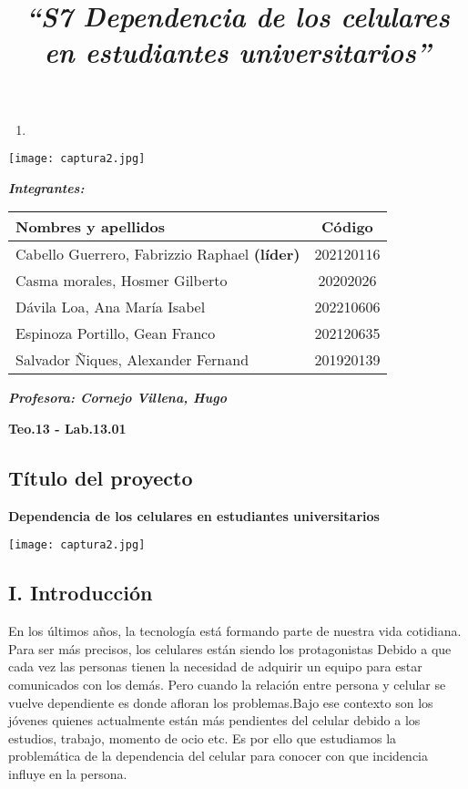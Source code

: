 \documentclass[
]{article}
\title{\textbf{\emph{``S7 Dependencia de los celulares en estudiantes
universitarios''}}}
\author{}
\date{\vspace{-2.5em}}
\begin{document}
\maketitle

\begin{enumerate}
\def\labelenumi{\arabic{enumi}.}
\item
\end{enumerate}

\texttt{[image: captura2.jpg]}

\textbf{\emph{Integrantes:}}

\begin{longtable}[]{@{}lc@{}}
\toprule()
\textbf{Nombres y apellidos} & \textbf{Código} \\
\midrule()
\endhead
Cabello Guerrero, Fabrizzio Raphael \textbf{(líder)} & 202120116 \\
Casma morales, Hosmer Gilberto & 20202026 \\
Dávila Loa, Ana María Isabel & 202210606 \\
Espinoza Portillo, Gean Franco & 202120635 \\
Salvador Ñiques, Alexander Fernand & 201920139 \\
\bottomrule()
\end{longtable}

\textbf{\emph{Profesora: Cornejo Villena, Hugo}}

\textbf{Teo.13 - Lab.13.01}

\hypertarget{tuxedtulo-del-proyecto}{%
\subsection{Título del proyecto}\label{tuxedtulo-del-proyecto}}

\textbf{Dependencia de los celulares en estudiantes universitarios}

\texttt{[image: captura2.jpg]}

\hypertarget{i.-introducciuxf3n}{%
\subsection{I. Introducción}\label{i.-introducciuxf3n}}

En los últimos años, la tecnología está formando parte de nuestra vida
cotidiana. Para ser más precisos, los celulares están siendo los
protagonistas Debido a que cada vez las personas tienen la necesidad de
adquirir un equipo para estar comunicados con los demás. Pero cuando la
relación entre persona y celular se vuelve dependiente es donde afloran
los problemas.Bajo ese contexto son los jóvenes quienes actualmente
están más pendientes del celular debido a los estudios, trabajo, momento
de ocio etc. Es por ello que estudiamos la problemática de la
dependencia del celular para conocer con que incidencia influye en la
persona.
\end{document}
